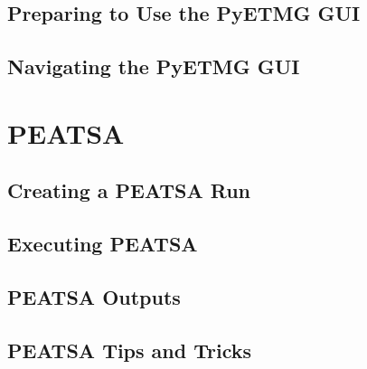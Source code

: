 \documentclass[11pt]{article}
\begin{document}
\subsection{Preparing to Use the PyETMG GUI}
\label{sec:pyemtg_gui_preparing_to_use}



\subsection{Navigating the PyETMG GUI}
\label{sec:pyemtg_gui_navigation}



\section{PEATSA}
\label{sec:peatsa}



\subsection{Creating a PEATSA Run}
\label{sec:creating_a_peatsa_run}



\subsection{Executing PEATSA}
\label{sec:executing_peatsa}

	

\subsection{PEATSA Outputs}
\label{sec:peatsa_outputs}



\subsection{PEATSA Tips and Tricks}
\label{sec:peatsa_tips_and_tricks}


\end{document}
